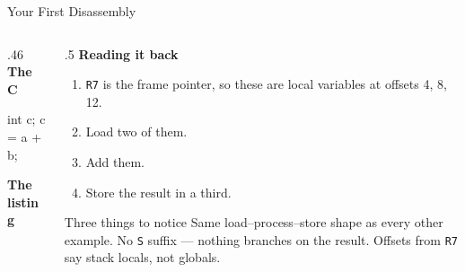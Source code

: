 \documentclass[9pt,aspectratio=169,xcolor=table]{beamer}
\begin{document}
\begin{frame}[fragile]{Your First Disassembly}
    \begin{columns}[T]
    \begin{column}{.46\textwidth}
        \textbf{The C}

        \vspace{1mm}
        \begin{cc}
int c;
c = a + b;
        \end{cc}

        \vspace{3mm}
        \textbf{The listing}

        \vspace{1mm}
    \end{column}
    \begin{column}{.5\textwidth}
        \textbf{Reading it back}

        \vspace{1mm}
        {\small
        \begin{enumerate}\itemsep1pt
            \item \texttt{R7} is the \alert{frame pointer}, so these are
                  \alert{local variables} at offsets 4, 8, 12.
            \item Load two of them.
            \item Add them.
            \item Store the result in a third.
        \end{enumerate}}

        \vspace{3mm}
        \begin{block}{Three things to notice}
            {\small Same \alert{load--process--store} shape as every other
            example. No \texttt{S} suffix --- nothing branches on the
            result. Offsets from \texttt{R7} say \alert{stack locals}, not
            globals.}
        \end{block}
    \end{column}
    \end{columns}
\end{frame}
\end{document}
